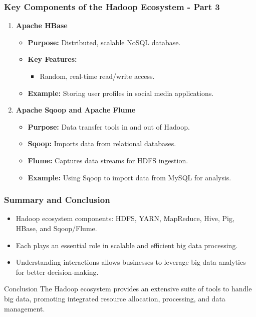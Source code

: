 \documentclass[aspectratio=169]{beamer}
\begin{document}
\begin{frame}[fragile]
    \frametitle{Key Components of the Hadoop Ecosystem - Part 3}
    \begin{enumerate}[resume]
        \item \textbf{Apache HBase}
        \begin{itemize}
            \item \textbf{Purpose:} Distributed, scalable NoSQL database.
            \item \textbf{Key Features:}
            \begin{itemize}
                \item Random, real-time read/write access.
            \end{itemize}
            \item \textbf{Example:} Storing user profiles in social media applications.
        \end{itemize}

        \item \textbf{Apache Sqoop and Apache Flume}
        \begin{itemize}
            \item \textbf{Purpose:} Data transfer tools in and out of Hadoop.
            \item \textbf{Sqoop:} Imports data from relational databases.
            \item \textbf{Flume:} Captures data streams for HDFS ingestion.
            \item \textbf{Example:} Using Sqoop to import data from MySQL for analysis.
        \end{itemize}
    \end{enumerate}
\end{frame}

\begin{frame}[fragile]
    \frametitle{Summary and Conclusion}
    \begin{itemize}
        \item Hadoop ecosystem components: HDFS, YARN, MapReduce, Hive, Pig, HBase, and Sqoop/Flume.
        \item Each plays an essential role in scalable and efficient big data processing.
        \item Understanding interactions allows businesses to leverage big data analytics for better decision-making.
    \end{itemize}
    \begin{block}{Conclusion}
        The Hadoop ecosystem provides an extensive suite of tools to handle big data, promoting integrated resource allocation, processing, and data management.
    \end{block}
\end{frame}
\end{document}
